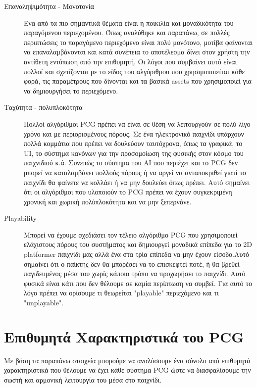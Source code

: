 \begin{description}
\item [Επαναληψιμότητα - Μονοτονία] Ένα από τα πιο σημαντικά θέματα είναι η ποικιλία και μοναδικότητα του παραγόμενου περιεχομένου. Όπως αναλύθηκε και παραπάνω, σε πολλές περιπτώσεις το παραγόμενο περιεχόμενο είναι πολύ μονότονο, μοτίβα φαίνονται να επαναλαμβάνονται και κατά συνέπεια το αποτέλεσμα δίνει στον χρήστη την αντίθετη εντύπωση από την επιθυμητή. Οι λόγοι που συμβαίνει αυτό είναι πολλοί και σχετίζονται με το είδος του αλγόριθμου που χρησιμοποιείται κάθε φορά, τις παραμέτρους που δίνονται και τα βασικά assets που χρησιμοποιεί για να δημιουργήσει το περιεχόμενο.

\item [Ταχύτητα - πολυπλοκότητα] Πολλοί αλγόριθμοι PCG πρέπει να είναι σε θέση να λειτουργούν σε πολύ λίγο χρόνο και με περιορισμένους πόρους. Σε ένα ηλεκτρονικό παιχνίδι υπάρχουν πολλά κομμάτια που πρέπει να δουλεύουν ταυτόχρονα, όπως τα γραφικά, το UI, το σύστημα κανόνων για την προσομοίωση της φυσικής στον κόσμο του παιχνιδιού κ.ά. Συνεπώς το σύστημα του AI που περιέχει και το PCG δεν μπορεί να καταλαμβάνει πολλούς πόρους ή να αργεί να ανταποκριθεί γιατί το παιχνίδι θα φαίνετε να κολλάει ή να μην δουλεύει όπως πρέπει. Αυτό σημαίνει ότι οι αλγόριθμοι που υλοποιούν το PCG πρέπει να έχουν συγκεκριμένη χρονική και χωρική πολύπλοκότητα και να μην ξεπερνάνε.

\item [Playability] Μπορεί να έχουμε σχεδιάσει τον τέλειο αλγόριθμο PCG που χρησιμοποιεί ελάχιστους πόρους του συστήματος και δημιουργεί μοναδικά επίπεδα για το 2D platformer παιχνίδι μας αλλά ένα στα τρία επίπεδα να μην έχουν είσοδο.Αυτό σημαίνει ότι ο παίκτης δεν θα μπορέσει να το επισκεφτεί ποτέ, ή θα βρεθεί παγιδευμένος μέσα του χωρίς κάποιο τρόπο να προχωρήσει το παιχνίδι. Αυτό φυσικά είναι κάτι που δεν θέλουμε σε καμία περίπτωση να συμβεί. Για αυτό το λόγο πρέπει να ορίσουμε τι θεωρείται "playable" περιεχόμενο και τι "unplayable".
 
\end{description}


\section{Επιθυμητά Χαρακτηριστικά του PCG}
Με βάση τα παραπάνω στοιχεία μπορούμε να αναλύσουμε ένα σύνολο από επιθυμητά χαρακτηριστικά που θέλουμε να έχει κάθε σύστημα PCG ώστε να διασφαλίσουμε την σωστή και αρμονική λειτουργία του μέσα στο παιχνίδι.  \cite{challenges} \cite{desirableproperties}

